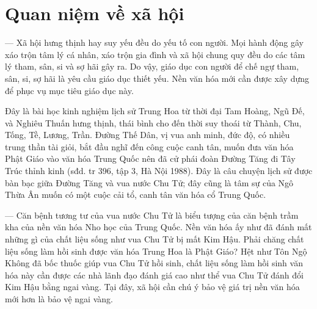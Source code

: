 \section{Quan niệm về xã hội} %
\label{sec:68_69_xa_hoi}

--- Xã hội hưng thịnh hay suy yếu đều do yếu tố con người. Mọi hành động gây xáo trộn tâm lý cá nhân, xáo trộn gia đình và xã hội chung quy đều do các tâm lý tham, sân, si và sợ hãi gây ra. Do vậy, giáo dục con người để chế ngự tham, sân, si, sợ hãi là yêu cầu giáo dục thiết yếu. Nền văn hóa mới cần được xây dựng để phục vụ mục tiêu giáo dục này.

Đây là bài học kinh nghiệm lịch sử Trung Hoa từ thời đại Tam Hoàng, Ngũ Đế, và Nghiêu Thuấn hưng thịnh, thái bình cho đến thời suy thoái từ Thành, Chu, Tống, Tề, Lương, Trần. Đường Thế Dân, vị vua anh minh, đức độ, có nhiều trung thần tài giỏi, bắt đầu nghĩ đến công cuộc canh tân, muốn đưa văn hóa Phật Giáo vào văn hóa Trung Quốc nên đã cử phái đoàn Đường Tăng đi Tây Trúc thỉnh kinh (sđd. tr 396, tập 3, Hà Nội 1988). Đây là câu chuyện lịch sử được bàn bạc giữa Đường Tăng và vua nước Chu Tử; đây cũng là tâm sự của Ngô Thừa Ân muốn có một cuộc cải tổ, canh tân văn hóa cổ Trung Quốc.

--- Căn bệnh tương tư của vua nước Chu Tử là biểu tượng của căn bệnh trầm kha của nền văn hóa Nho học của Trung Quốc. Nền văn hóa ấy như đã đánh mất những gì của chất liệu sống như vua Chu Tử bị mất Kim Hậu. Phải chăng chất liệu sống làm hồi sinh được văn hóa Trung Hoa là Phật Giáo? Hệt như Tôn Ngộ Không đã bốc thuốc giúp vua Chu Tử hồi sinh, chất liệu sống làm hồi sinh văn hóa này cần được các nhà lãnh đạo đánh giá cao như thể vua Chu Tử đánh đổi Kim Hậu bằng ngai vàng. Tại đây, xã hội cần chú ý bảo vệ giá trị nền văn hóa mới hơn là bảo vệ ngai vàng.
